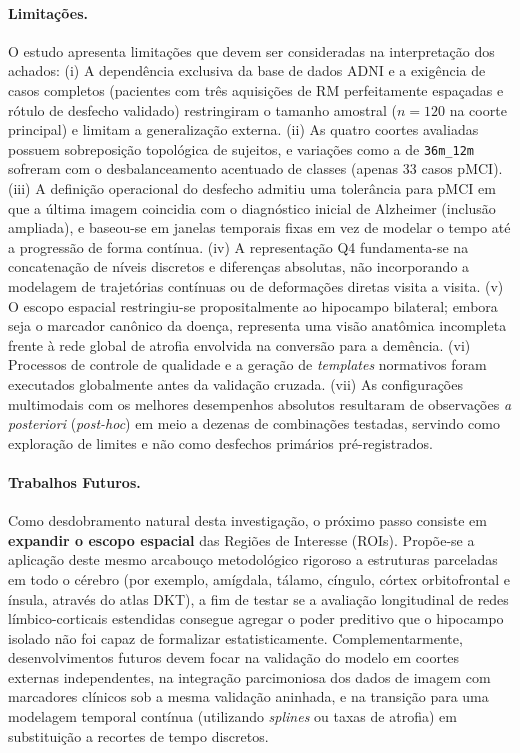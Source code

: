 \documentclass[review]{elsarticle}
\newcommand{\code}[1]{\texttt{#1}}
\begin{document}
\paragraph{Limitações.}
O estudo apresenta limitações que devem ser consideradas na interpretação dos achados:
(i) A dependência exclusiva da base de dados ADNI e a exigência de casos completos (pacientes com três aquisições de RM perfeitamente espaçadas e rótulo de desfecho validado) restringiram o tamanho amostral ($n=120$ na coorte principal) e limitam a generalização externa.
(ii) As quatro coortes avaliadas possuem sobreposição topológica de sujeitos, e variações como a de \code{36m\_12m} sofreram com o desbalanceamento acentuado de classes (apenas 33 casos pMCI).
(iii) A definição operacional do desfecho admitiu uma tolerância para pMCI em que a última imagem coincidia com o diagnóstico inicial de Alzheimer (inclusão ampliada), e baseou-se em janelas temporais fixas em vez de modelar o tempo até a progressão de forma contínua.
(iv) A representação Q4 fundamenta-se na concatenação de níveis discretos e diferenças absolutas, não incorporando a modelagem de trajetórias contínuas ou de deformações diretas visita a visita.
(v) O escopo espacial restringiu-se propositalmente ao hipocampo bilateral; embora seja o marcador canônico da doença, representa uma visão anatômica incompleta frente à rede global de atrofia envolvida na conversão para a demência.
(vi) Processos de controle de qualidade e a geração de \emph{templates} normativos foram executados globalmente antes da validação cruzada.
(vii) As configurações multimodais com os melhores desempenhos absolutos resultaram de observações \emph{a posteriori} (\emph{post-hoc}) em meio a dezenas de combinações testadas, servindo como exploração de limites e não como desfechos primários pré-registrados.

\paragraph{Trabalhos Futuros.}
Como desdobramento natural desta investigação, o próximo passo consiste em \textbf{expandir o escopo espacial} das Regiões de Interesse (ROIs). Propõe-se a aplicação deste mesmo arcabouço metodológico rigoroso a estruturas parceladas em todo o cérebro (por exemplo, amígdala, tálamo, cíngulo, córtex orbitofrontal e ínsula, através do atlas DKT), a fim de testar se a avaliação longitudinal de redes límbico-corticais estendidas consegue agregar o poder preditivo que o hipocampo isolado não foi capaz de formalizar estatisticamente. Complementarmente, desenvolvimentos futuros devem focar na validação do modelo em coortes externas independentes, na integração parcimoniosa dos dados de imagem com marcadores clínicos sob a mesma validação aninhada, e na transição para uma modelagem temporal contínua (utilizando \emph{splines} ou taxas de atrofia) em substituição a recortes de tempo discretos.
\end{document}
